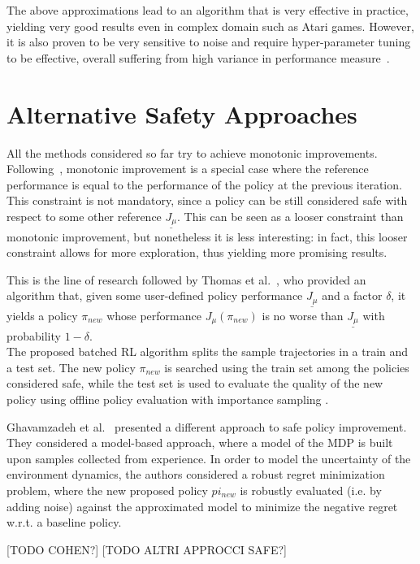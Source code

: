 The above approximations lead to an algorithm that is very effective in practice, yielding very good results even in complex domain such as Atari games. However, it is also proven to be very sensitive to noise and require hyper-parameter tuning to be effective, overall suffering from high variance in performance measure~\cite{2017arXiv170804133I}.

\section{Alternative Safety Approaches}
\label{sec:other-safe}
All the methods considered so far try to achieve monotonic improvements. Following~, monotonic improvement is a special case where the reference performance is equal to the performance of the policy at the previous iteration. This constraint is not mandatory, since a policy can be still considered safe with respect to some other reference $\underline{J_\mu}$. This can be seen as a looser constraint than monotonic improvement, but nonetheless it is less interesting: in fact, this looser constraint allows for more exploration, thus yielding more promising results. 

This is the line of research followed by Thomas et al.~\cite{pmlr-v37-thomas15}, who provided an algorithm that, given some user-defined policy performance $\underline{J_\mu}$ and a factor $\delta$, it yields a policy $\pi_{new}$ whose performance $J_\mu(\pi_{new})$ is no worse than $\underline{J_\mu}$ with probability $1-\delta$.\\
The proposed batched RL algorithm splits the sample trajectories in a train and a test set. The new policy $\pi_{new}$ is searched using the train set among the policies considered safe, while the test set is used to evaluate the quality of the new policy using offline policy evaluation with importance sampling \cite{Precup:2000:ETO:645529.658134}. 

Ghavamzadeh et al.~\cite{Petrik:2016:SPI:3157096.3157354} presented a different approach to safe policy improvement. They considered a model-based approach, where a model of the MDP is built upon samples collected from experience. In order to model the uncertainty of the environment dynamics, the authors considered a robust regret minimization problem, where the new proposed policy $pi_{new}$ is robustly evaluated (i.e. by adding noise) against the approximated model to minimize the negative regret w.r.t. a baseline policy. 

[TODO COHEN?]
[TODO ALTRI APPROCCI SAFE?]

